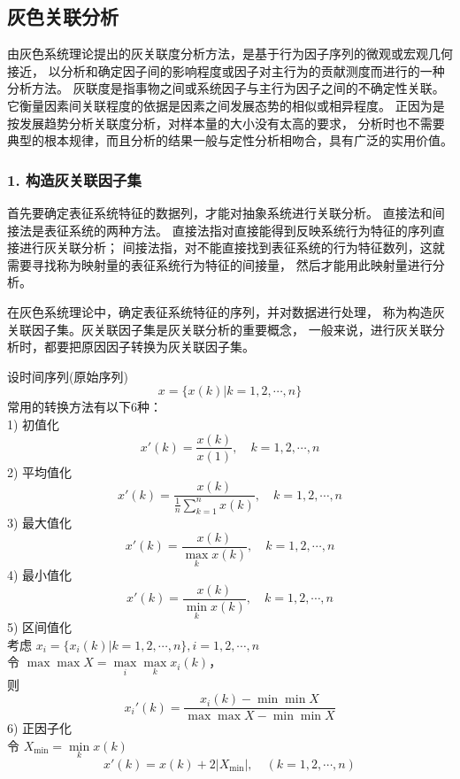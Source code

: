 \subsection{灰色关联分析}
由灰色系统理论提出的灰关联度分析方法，是基于行为因子序列的微观或宏观几何接近，
以分析和确定因子间的影响程度或因子对主行为的贡献测度而进行的一种分析方法。
灰联度是指事物之间或系统因子与主行为因子之间的不确定性关联。
它衡量因素间关联程度的依据是因素之间发展态势的相似或相异程度。
正因为是按发展趋势分析关联度分析，对样本量的大小没有太高的要求，
分析时也不需要典型的根本规律，而且分析的结果一般与定性分析相吻合，具有广泛的实用价值。

\subsubsection*{1. 构造灰关联因子集}
首先要确定表征系统特征的数据列，才能对抽象系统进行关联分析。
直接法和间接法是表征系统的两种方法。
直接法指对直接能得到反映系统行为特征的序列直接进行灰关联分析；
间接法指，对不能直接找到表征系统的行为特征数列，这就需要寻找称为映射量的表征系统行为特征的间接量，
然后才能用此映射量进行分析。

在灰色系统理论中，确定表征系统特征的序列，并对数据进行处理，
称为构造灰关联因子集。灰关联因子集是灰关联分析的重要概念，
一般来说，进行灰关联分析时，都要把原因因子转换为灰关联因子集。

设时间序列(原始序列)
\begin{equation}
x=\{x(k)|k=1,2, \cdots ,n\}
\end{equation}
常用的转换方法有以下6种： \\
1) 初值化
\begin{equation}
x'(k)=\frac{x(k)}{x(1)}, \quad k=1,2, \cdots, n
\end{equation}
2) 平均值化
\begin{equation}
x'(k)=\frac{x(k)}{\frac{1}{n} \sum_{k=1}^n x(k)}, \quad k=1,2, \cdots, n
\end{equation}
3) 最大值化
\begin{equation}
x'(k)=\frac{x(k)}{\underset{k}{\max} x(k)}, \quad k=1,2, \cdots, n
\end{equation}
4) 最小值化
\begin{equation}
x'(k)=\frac{x(k)}{\underset{k}{\min} x(k)}, \quad k=1,2, \cdots, n
\end{equation}
5) 区间值化 \\
考虑 $x_i=\{x_i(k)|k=1,2, \cdots ,n\}, i=1,2, \cdots ,n$ \\
令 $\max\max X=\underset{i}{\max} \underset{k}{\max} x_i(k)$，\\
则
\begin{equation}
x_i'(k)=\frac{x_i(k)-\min\min X}{\max\max X - \min\min X}
\end{equation}
6) 正因子化 \\
令 $X_{\min}=\underset{k}{\min}x(k)$
\begin{equation}
x'(k)=x(k)+2|X_{\min}|, \quad (k=1,2, \cdots, n)
\end{equation}


